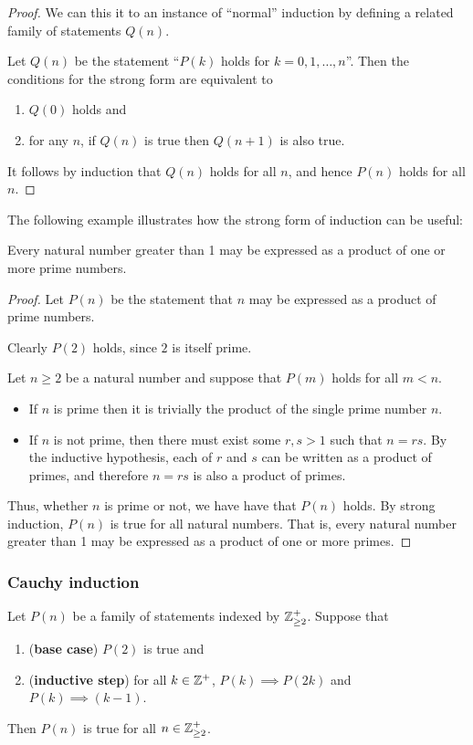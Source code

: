 \begin{proof}
We can this it to an instance of ``normal'' induction by defining a related family of statements $Q(n)$. 

Let $Q(n)$ be the statement ``$P(k)$ holds for $k=0,1,\dots,n$''. Then the conditions for the strong form are equivalent to 
\begin{enumerate}[label=(\roman*)]
\item $Q(0)$ holds and 
\item for any $n$, if $Q(n)$ is true then $Q(n+1)$ is also true.
\end{enumerate}
It follows by induction that $Q(n)$ holds for all $n$, and hence $P(n)$ holds for all $n$.
\end{proof}

The following example illustrates how the strong form of induction can be useful:

\begin{example}
Every natural number greater than 1 may be expressed as a product of one or more prime numbers.
\end{example}

\begin{proof}
Let $P(n)$ be the statement that $n$ may be expressed as a product of prime numbers. 

Clearly $P(2)$ holds, since $2$ is itself prime. 

Let $n \ge 2$ be a natural number and suppose that $P(m)$ holds for all $m<n$.

\begin{itemize}
\item If $n$ is prime then it is trivially the product of the single prime number $n$. 

\item If $n$ is not prime, then there must exist some $r, s > 1$ such that $n = rs$. By the inductive hypothesis, each of $r$ and $s$ can be written as a product of primes, and therefore $n = rs$ is also a product of primes.
\end{itemize}

Thus, whether $n$ is prime or not, we have have that $P(n)$ holds. By strong induction, $P(n)$ is true for all natural numbers. That is, every natural number greater than 1 may be expressed as a product of one or more primes.
\end{proof}

\subsubsection{Cauchy induction}
\begin{theorem}
Let $P(n)$ be a family of statements indexed by $\mathbb Z^+_{\ge2}$. Suppose that
\begin{enumerate}[label=(\roman*)]
\item (\textbf{base case}) $P(2)$ is true and
\item (\textbf{inductive step}) for all $k\in\mathbb Z^+$, $P(k)\implies P(2k)$ and $P(k)\implies (k-1)$.
\end{enumerate}
Then $P(n)$ is true for all $n\in\mathbb Z^+_{\ge2}$.
\end{theorem}

